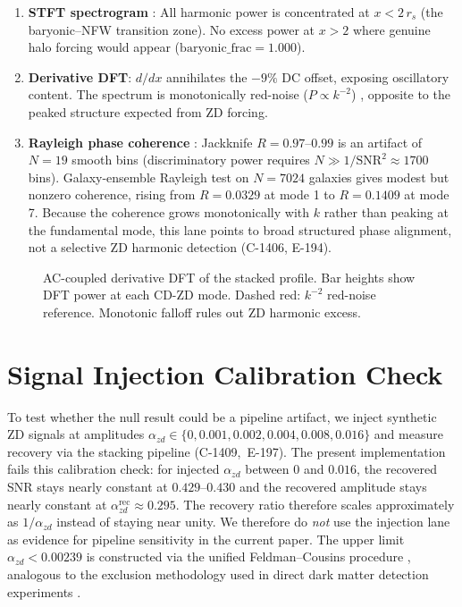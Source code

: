\documentclass[aa]{aa}
\begin{document}
\begin{enumerate}
  \item \textbf{STFT spectrogram} \citep{gabor1946}: All harmonic power is
    concentrated at $x < 2\,r_s$ (the baryonic--NFW transition zone). No excess
    power at $x > 2$ where genuine halo forcing would appear
    ($\mathrm{baryonic\_frac} = 1.000$).
  \item \textbf{Derivative DFT}: $d/dx$ annihilates the $-9\%$ DC offset,
    exposing oscillatory content. The spectrum is monotonically red-noise
    ($P \propto k^{-2}$) \citep[cf.\ significance testing against red-noise
    nulls;][]{torrence1998}, opposite to the peaked structure expected from
    ZD forcing.
  \item \textbf{Rayleigh phase coherence} \citep{mardia2000}: Jackknife
    $R = 0.97$--$0.99$ is an artifact of $N = 19$ smooth bins (discriminatory
    power requires $N \gg 1/\mathrm{SNR}^2 \approx 1700$ bins). Galaxy-ensemble
    Rayleigh test on $N = 7024$ galaxies gives modest but nonzero coherence,
    rising from $R = 0.0329$ at mode 1 to $R = 0.1409$ at mode 7. Because the
    coherence grows monotonically with $k$ rather than peaking at the
    fundamental mode, this lane points to broad structured phase alignment,
    not a selective ZD harmonic detection (C-1406, E-194).
\end{enumerate}

\begin{figure}[h]
  \centering
  
  \caption{AC-coupled derivative DFT of the stacked profile. Bar heights
    show DFT power at each CD-ZD mode. Dashed red: $k^{-2}$ red-noise
    reference. Monotonic falloff rules out ZD harmonic excess.}
  \label{fig:deriv_dft}
\end{figure}

\section{Signal Injection Calibration Check}
\label{sec:injection}

To test whether the null result could be a pipeline artifact, we inject synthetic
ZD signals at amplitudes $\alpha_{zd} \in \{0, 0.001, 0.002, 0.004, 0.008,
0.016\}$ and measure recovery via the stacking pipeline
\citep[following the injection-recovery methodology of][]{zhu2023}
\mbox{(C-1409, E-197)}.
The present implementation fails this calibration check: for injected
$\alpha_{zd}$ between $0$ and $0.016$, the recovered SNR stays nearly constant
at $0.429$--$0.430$ and the recovered amplitude stays nearly constant at
$\alpha^\mathrm{rec}_{zd} \approx 0.295$. The recovery ratio therefore scales
approximately as $1/\alpha_{zd}$ instead of staying near unity. We therefore do
\emph{not} use the injection lane as evidence for pipeline sensitivity in the
current paper. The upper limit $\alpha_{zd} < 0.00239$ is constructed via the
unified Feldman--Cousins procedure
\citep{feldman1998}, analogous to the exclusion methodology used in direct
dark matter detection experiments \citep{xenon1t2018}.
\end{document}
